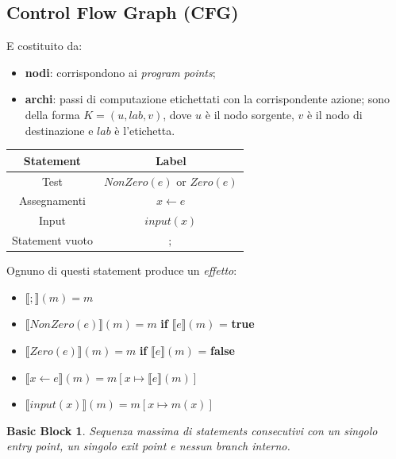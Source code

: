 \documentclass{article}
\begin{document}
        \subsection{Control Flow Graph (CFG)}
            E costituito da:
            \begin{itemize}
                \item \textbf{nodi}: corrispondono ai \textit{program points};
                \item \textbf{archi}: passi di computazione etichettati con la corrispondente azione; sono della forma $K=(u, lab, v)$, dove $u$ è il nodo sorgente, $v$ è il nodo di destinazione e $lab$ è l'etichetta.
            \end{itemize}	
            \begin{center}
                \begin{tabular}{cc}
                    \hline
                    \textbf{Statement} & \textbf{Label} \\
                    \hline
                    \hline
                    Test & $NonZero(e)$ or $Zero(e)$ \\
                    Assegnamenti & $x \leftarrow e$ \\
                    Input & $ input(x) $ \\
                    Statement vuoto & $;$ \\
                    \hline
                \end{tabular}
            \end{center}
            Ognuno di questi statement produce un \textit{effetto}:
            \begin{itemize}
                \item $ \llbracket ; \rrbracket (m) = m $
                \item $ \llbracket NonZero(e) \rrbracket (m) = m $ \textbf{if} $ \llbracket e \rrbracket (m) $ = \textbf{true}
                \item $ \llbracket Zero(e) \rrbracket (m) = m $ \textbf{if} $ \llbracket e \rrbracket (m) $ = \textbf{false}
                \item $ \llbracket x \gets e \rrbracket (m) = m[x \mapsto \llbracket e \rrbracket (m)] $
                \item $ \llbracket input(x) \rrbracket (m) = m[x \mapsto m(x)] $
            \end{itemize}
            \newtheorem*{definit1}{Basic Block}
            \begin{definit1}
                Sequenza massima di statements consecutivi con un singolo \textit{entry point}, un singolo \textit{exit point} e nessun \textit{branch} interno.
            \end{definit1}
\end{document}
